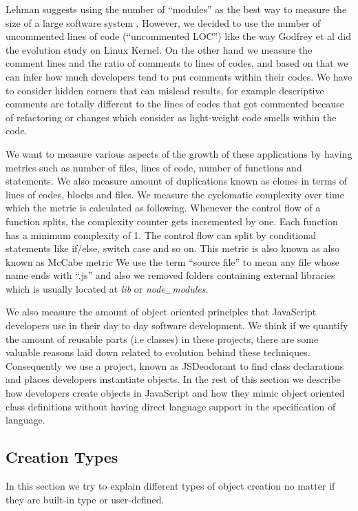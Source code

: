 Lehman suggests using the number of “modules” as the best way to measure the size of a large software system \cite{637156}. However, we decided to use the number of uncommented lines of code (“uncommented LOC”) like the way Godfrey et al \cite{883030} did the evolution study on Linux Kernel. On the other hand we measure the comment lines and the ratio of comments to lines of codes, and based on that we can infer how much developers tend to put comments within their codes. We have to consider hidden corners that can mislead results, for example descriptive comments are totally different to the lines of codes that got commented because of refactoring or changes which consider as light-weight code smells within the code.

\par We want to measure various aspects of the growth of these applications by having metrics such as number of files, lines of code, number of functions and statements. We also measure amount of duplications known as clones in terms of lines of codes, blocks and files. We measure the cyclomatic complexity over time which the metric is calculated as following. Whenever the control flow of a function splits, the complexity counter gets incremented by one. Each function has a minimum complexity of 1. The control flow can split by conditional statements like if/else, switch case and so on. This metric is also known as also known as McCabe metric
We use the term “source file” to mean any file whose name ends with “.js” and also we removed folders containing external libraries which is usually located at \textit{lib} or \textit{node\_modules}. 

\par We also measure the amount of object oriented principles that JavaScript developers use in their day to day software development. We think if we quantify the amount of reusable parts (i.e classes) in these projects, there are some valuable reasons laid down related to evolution behind these techniques. Consequently we use a project, known as JSDeodorant to find class declarations and places developers instantiate objects.
In the rest of this section we describe how developers create objects in JavaScript and how they mimic object oriented class definitions without having direct language support in the specification of language.


\subsection{Creation Types}
In this section we try to explain different types of object creation no matter if they are built-in type or user-defined. 

